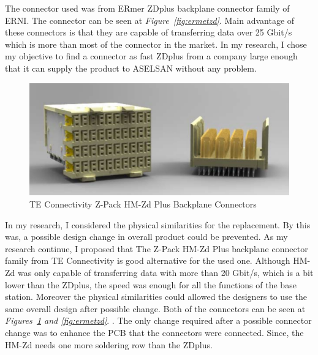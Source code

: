 	The connector used was from ERmer ZDplus backplane connector family of ERNI. The connector can be seen at \textit{Figure~\ref{fig:ermetzd}}. Main advantage of these connectors is that they are capable of transferring data over 25 Gbit/s which is more than most of the connector in the market. In my research, I chose my objective to find a connector as fast ZDplus from a company large enough that it can supply the product to ASELSAN without any problem.  \\
	
\begin{figure}[H]
	\center
	\setlength{\unitlength}{\textwidth} 
	\includegraphics[width=0.9\unitlength]{zpack}
	\caption{\label{fig:zpack}TE Connectivity Z-Pack HM-Zd Plus Backplane Connectors \cite{teconnec}}
\end{figure}



	 
	In my research, I considered the physical similarities for the replacement. By this was, a possible design change in overall product could be prevented. As my research continue, I proposed that The Z-Pack HM-Zd Plus backplane connector family from TE Connectivity is good alternative for the used one. Although HM-Zd was only capable of transferring data with more than 20 Gbit/s, which is  a bit lower than the ZDplus, the speed was enough for all the functions of the base station. Moreover the physical similarities could allowed the designers to use the same overall design after possible change. Both of the connectors can be seen at \textit{Figures~\ref{fig:zpack} and \ref{fig:ermetzd}}.\cite{ermetzd}  \cite{teconnec}. The only change required after a possible connector change was to enhance the PCB that the connectors were connected. Since, the HM-Zd needs one more soldering row than the ZDplus. \\
	
